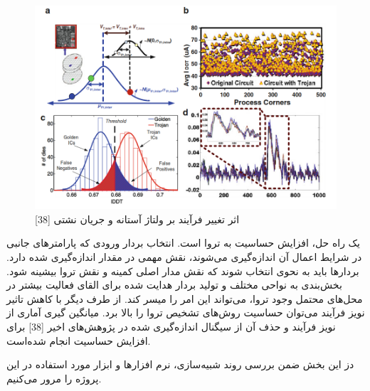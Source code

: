  \begin{figure}
\begin{center}
\includegraphics[scale=0.7]{figs/fig3-4.png}
\caption{اثر تغییر فرآیند بر ولتاژ آستانه و جریان نشتی [38]}
\label{fig3-4}
\end{center}
\end{figure}
یک راه حل، افزایش حساسیت به تروا است. انتخاب بردار ورودی که پارامترهای جانبی در شرایط اعمال آن اندازه‌گیری می‌شوند، نقش مهمی در مقدار اندازه‌گیری شده دارد. بردارها باید به نحوی انتخاب شوند که نقش مدار اصلی کمینه و نقش تروا بیشینه شود. بخش‌بندی به نواحی مختلف و تولید بردار هدایت شده برای القای فعالیت بیشتر در محل‌های محتمل وجود تروا، می‌تواند این امر را میسر کند.  از طرف دیگر با کاهش تاثیر نویز فرآیند می‌توان حساسیت روش‌های تشخیص تروا را بالا برد. میانگین گیری آماری از نویز فرآیند و حذف آن از سیگنال اندازه‌گیری شده در پژوهش‌های اخیر [38] برای افزایش حساسیت انجام شده‌است.



دز این بخش ضمن بررسی روند شبیه‌سازی، نرم افزار‌ها و ابزار مورد استفاده در این پروژه را مرور می‌کنیم.

